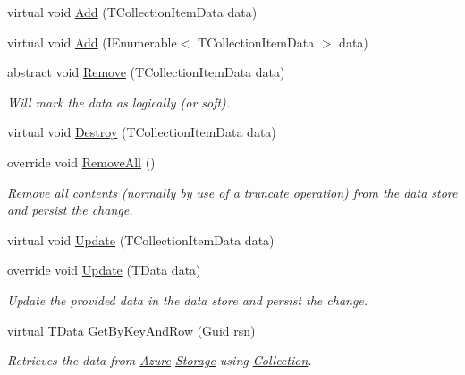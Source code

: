 \begin{DoxyCompactItemize}
virtual void \hyperlink{classCqrs_1_1Azure_1_1BlobStorage_1_1TableStorageStore_ae48083bacf8a74175122e7618ae2a605_ae48083bacf8a74175122e7618ae2a605}{Add} (T\+Collection\+Item\+Data data)
\item 
virtual void \hyperlink{classCqrs_1_1Azure_1_1BlobStorage_1_1TableStorageStore_a79dc78a910107ede003b145a2da25897_a79dc78a910107ede003b145a2da25897}{Add} (I\+Enumerable$<$ T\+Collection\+Item\+Data $>$ data)
\item 
abstract void \hyperlink{classCqrs_1_1Azure_1_1BlobStorage_1_1TableStorageStore_a8e013351f5dcccd1915bf7ed6c58317e_a8e013351f5dcccd1915bf7ed6c58317e}{Remove} (T\+Collection\+Item\+Data data)
\begin{DoxyCompactList}\small\item\em Will mark the {\itshape data}  as logically (or soft). \end{DoxyCompactList}\item 
virtual void \hyperlink{classCqrs_1_1Azure_1_1BlobStorage_1_1TableStorageStore_a0b408504b9553b9c649b7186a382052a_a0b408504b9553b9c649b7186a382052a}{Destroy} (T\+Collection\+Item\+Data data)
\item 
override void \hyperlink{classCqrs_1_1Azure_1_1BlobStorage_1_1TableStorageStore_aadd66b35bfa105ef4446bd791e99a3d5_aadd66b35bfa105ef4446bd791e99a3d5}{Remove\+All} ()
\begin{DoxyCompactList}\small\item\em Remove all contents (normally by use of a truncate operation) from the data store and persist the change. \end{DoxyCompactList}\item 
virtual void \hyperlink{classCqrs_1_1Azure_1_1BlobStorage_1_1TableStorageStore_aacb673aed5c6f828917f4d2e8c2ff75b_aacb673aed5c6f828917f4d2e8c2ff75b}{Update} (T\+Collection\+Item\+Data data)
\item 
override void \hyperlink{classCqrs_1_1Azure_1_1BlobStorage_1_1TableStorageStore_a869eba77358b10fc298f8e13fb21d628_a869eba77358b10fc298f8e13fb21d628}{Update} (T\+Data data)
\begin{DoxyCompactList}\small\item\em Update the provided {\itshape data}  in the data store and persist the change. \end{DoxyCompactList}\item 
virtual T\+Data \hyperlink{classCqrs_1_1Azure_1_1BlobStorage_1_1TableStorageStore_ab7c4ae1a7b13e6bd1c36c242b753edba_ab7c4ae1a7b13e6bd1c36c242b753edba}{Get\+By\+Key\+And\+Row} (Guid rsn)
\begin{DoxyCompactList}\small\item\em Retrieves the data from \hyperlink{namespaceCqrs_1_1Azure}{Azure} \hyperlink{namespaceCqrs_1_1Azure_1_1Storage}{Storage} using \hyperlink{classCqrs_1_1Azure_1_1BlobStorage_1_1TableStorageStore_a97752ec9c5ad130a230924da9a75a537_a97752ec9c5ad130a230924da9a75a537}{Collection}. \end{DoxyCompactList}\item 

\end{DoxyCompactItemize}
